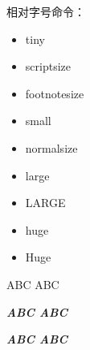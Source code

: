 \documentclass{ctexart}
\begin{document}

           
            相对字号命令：
            \begin{itemize}
                \item {\tiny tiny} 
                \item {\scriptsize scriptsize}
                \item {\footnotesize footnotesize}
                \item {\small small}
                \item {\normalsize normalsize} 
                \item {\large large}
                \item {\LARGE LARGE}
                \item {\huge huge}
                \item {\Huge Huge}
            \end{itemize}
        
            ABC ABC

            {\sffamily\large\bfseries\itshape ABC \normalfont ABC}
            
            {\sffamily\large\bfseries\itshape ABC \normalsize ABC}
            
\end{document}
